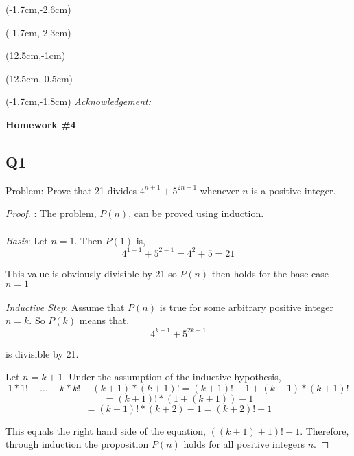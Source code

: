 \documentclass[12pt, oneside]{article}
\begin{document}
\begin{textblock*}{3cm}(-1.7cm,-2.6cm)
\end{textblock*}

\begin{textblock*}{4cm}(-1.7cm,-2.3cm)
\end{textblock*}

\begin{textblock*}{8cm}(12.5cm,-1cm)
\end{textblock*}
\begin{textblock*}{3cm}(12.5cm,-0.5cm)
\end{textblock*}
\begin{textblock*}{13.5cm}(-1.7cm,-1.8cm)
\noindent \textit{\footnotesize Acknowledgement: } 
\end{textblock*}

\vspace{1cm}

\begin{center}
\textbf{\Large Homework \#4}
\end{center}


\subsection*{Q1}
Problem: Prove that 21 divides $4^{n+1} + 5^{2n-1}$ whenever $n$ is a positive integer.

\begin{proof}:
The problem, $P(n)$, can be proved using induction.\\\\
\textit{Basis}: Let $n=1$. Then $P(1)$ is,
\[4^{1+1} + 5^{2-1} = 4^{2} + 5 = 21\]

 This value is obviously divisible by 21 so $P(n)$ then holds for the base case $n=1$\\\\
\textit{Inductive Step}: Assume that $P(n)$ is true for some arbitrary positive integer $n=k$. So $P(k)$ means that,
\[4^{k+1} + 5^{2k-1}\]

is divisible by 21.

Let $n = k+1$. Under the assumption of the inductive hypothesis,
\[1*1! +...+ k*k! + (k+1)*(k+1)! = (k+1)!-1 + (k+1)*(k+1)!\]
\[ = (k+1)!*(1 + (k+1)) -1 \]
\[ = (k+1)!*(k+2) -1 = (k+2)! - 1\]

This equals the right hand side of the equation, $((k+1)+1)! -1$. Therefore, through induction the proposition $P(n)$ holds for all positive integers $n$.
\end{proof}
\end{document}
